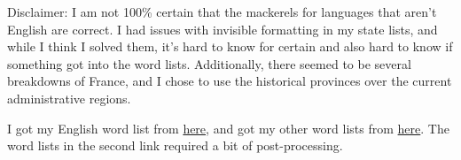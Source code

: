 \documentclass[11pt]{article}
\theoremstyle{definition}
\begin{document}
Disclaimer: I am not 100\% certain that the mackerels for languages that aren't English are correct.  I had issues with invisible formatting in my state lists, and while I think I solved them, it's hard to know for certain and also hard to know if something got into the word lists.  Additionally, there seemed to be several breakdowns of France, and I chose to use the historical provinces over the current administrative regions.

I got my English word list from \href{https://norvig.com/ngrams/word.list}{here}, and got my other word lists from \href{http://www.gwicks.net/dictionaries.htm}{here}.  The word lists in the second link required a bit of post-processing.
\end{document}
